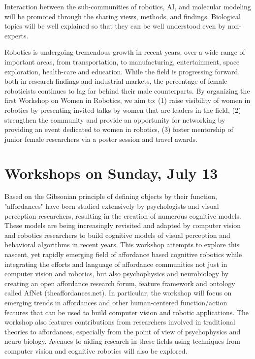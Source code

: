 \begin{spacing}{1.0}
{Interaction between the sub-communities of robotics, AI, and molecular modeling will be promoted through the sharing views, methods, and findings. Biological topics will be well explained so that they can be well understood even by non-experts.
}



{
Robotics is undergoing tremendous growth in recent years, over a wide range of important areas, from transportation, to manufacturing, entertainment, space exploration, health-care and education. While the field is progressing forward, both in research findings and industrial markets, the percentage of female roboticists continues to lag far behind their male counterparts. By organizing the first Workshop on Women in Robotics, we aim to: (1) raise visibility of women in robotics by presenting invited talks by women that are leaders in the field, (2) strengthen the community and provide an opportunity for networking by providing an event dedicated to women in robotics, (3) foster mentorship of junior female researchers via a poster session and travel awards.
}


\chapter{Workshops on Sunday, July 13}

\vspace*{-2.0cm}


{
Based on the Gibsonian principle of defining objects by their function, "affordances" have been studied extensively by psychologists and visual perception researchers, resulting in the creation of numerous cognitive models. These models are being increasingly revisited and adapted by computer vision and robotics researchers to build cognitive models of visual perception and behavioral algorithms in recent years. This workshop attempts to explore this nascent, yet rapidly emerging field of affordance based cognitive robotics while integrating the efforts and language of affordance communities not just in computer vision and robotics, but also psychophysics and neurobiology by creating an open affordance research forum, feature framework and ontology called AfNet (theaffordances.net). In particular, the workshop will focus on emerging trends in affordances and other human-centered function/action features that can be used to build computer vision and robotic applications. The workshop also features contributions from researchers involved in traditional theories to affordances, especially from the point of view of psychophysics and neuro-biology. Avenues to aiding research in these fields using techniques from computer vision and cognitive robotics will also be explored.

}
\end{spacing}
